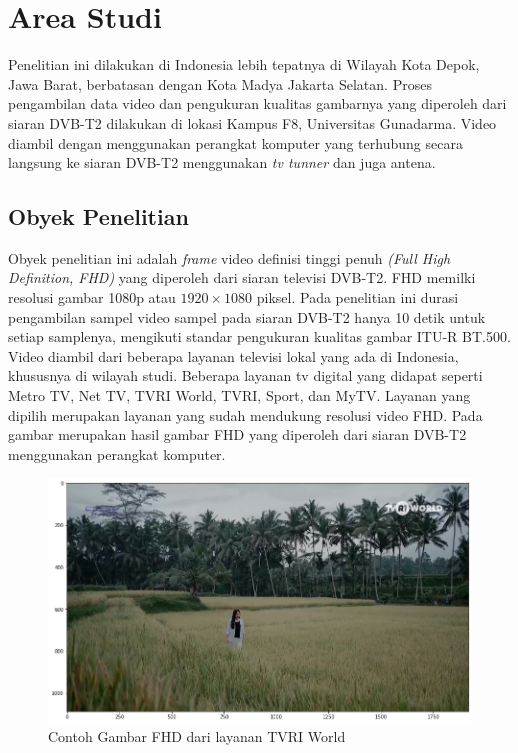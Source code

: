 \section{Area Studi}
\hspace{1,2cm}
Penelitian ini dilakukan di Indonesia lebih tepatnya di Wilayah Kota Depok, Jawa Barat, berbatasan dengan Kota Madya Jakarta Selatan. Proses pengambilan data video dan pengukuran kualitas gambarnya yang diperoleh dari siaran DVB-T2 dilakukan di lokasi Kampus F8, Universitas Gunadarma. Video diambil dengan menggunakan perangkat komputer yang terhubung secara langsung ke siaran DVB-T2 menggunakan\textit{ tv tunner} dan juga antena. 

\subsection{Obyek Penelitian}
\hspace{1,2cm}
Obyek penelitian ini adalah \textit{frame} video definisi tinggi penuh \textit{(Full High Definition, FHD)} yang diperoleh dari siaran televisi DVB-T2. FHD memilki resolusi gambar 1080p atau $1920\times1080$ piksel. Pada penelitian ini durasi pengambilan sampel video sampel pada siaran DVB-T2 hanya 10 detik untuk setiap samplenya, mengikuti standar pengukuran kualitas gambar ITU-R BT.500. Video diambil dari beberapa layanan televisi lokal yang ada di Indonesia, khususnya di wilayah studi. Beberapa layanan tv digital yang didapat seperti Metro TV, Net TV, TVRI World, TVRI, Sport, dan MyTV. Layanan yang dipilih merupakan layanan yang sudah mendukung resolusi video FHD. Pada gambar  merupakan hasil gambar FHD yang diperoleh dari siaran DVB-T2 menggunakan perangkat komputer. 

\begin{figure}[H]
	\vspace{-0.1cm}
	\begin{center}
		\includegraphics[width=1\columnwidth]{bab3/Gambar/gambar-tvriw.png}
	\end{center}
	\vspace{-0.2cm}
	\caption{Contoh Gambar FHD dari layanan TVRI World} \label{gambar-tvriw}
\end{figure}


